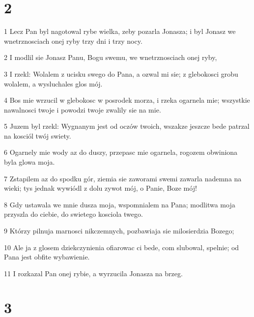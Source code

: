 \chapter{2}

\par 1 Lecz Pan byl nagotowal rybe wielka, zeby pozarla Jonasza; i byl Jonasz we wnetrznosciach onej ryby trzy dni i trzy nocy.
\par 2 I modlil sie Jonasz Panu, Bogu swemu, we wnetrznosciach onej ryby,
\par 3 I rzekl: Wolalem z ucisku swego do Pana, a ozwal mi sie; z glebokosci grobu wolalem, a wysluchales glos mój.
\par 4 Bos mie wrzucil w glebokosc w posrodek morza, i rzeka ogarnela mie; wszystkie nawalnosci twoje i powodzi twoje zwalily sie na mie.
\par 5 Juzem byl rzekl: Wygnanym jest od oczów twoich, wszakze jeszcze bede patrzal na kosciól twój swiety.
\par 6 Ogarnely mie wody az do duszy, przepasc mie ogarnela, rogozem obwiniona byla glowa moja.
\par 7 Zstapilem az do spodku gór, ziemia sie zaworami swemi zawarla nademna na wieki; tys jednak wywiódl z dolu zywot mój, o Panie, Boze mój!
\par 8 Gdy ustawala we mnie dusza moja, wspomnialem na Pana; modlitwa moja przyszla do ciebie, do swietego kosciola twego.
\par 9 Którzy pilnuja marnosci nikczemnych, pozbawiaja sie milosierdzia Bozego;
\par 10 Ale ja z glosem dziekczynienia ofiarowac ci bede, com slubowal, spelnie; od Pana jest obfite wybawienie.
\par 11 I rozkazal Pan onej rybie, a wyrzucila Jonasza na brzeg.

\chapter{3}

